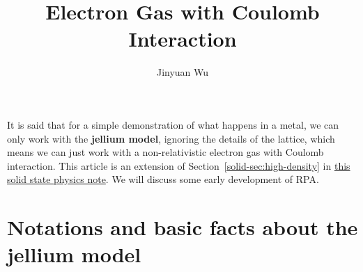 \documentclass[hyperref, a4paper]{article}
\title{Electron Gas with Coulomb Interaction}
\author{Jinyuan Wu}
\newcommand*{\concept}[1]{{\textbf{#1}}}
\newcommand{\soliddoc}{\href{../solid/solid.pdf}{this solid state physics note}}
\begin{document}
\maketitle

It is said that for a simple demonstration of what happens in a metal, we can only work with the \concept{jellium model},
ignoring the details of the lattice, which means we can just work with a non-relativistic electron gas with Coulomb
interaction.  This article is an extension of Section~\ref{solid-sec:high-density} in \soliddoc. We will discuss some early development of RPA.

\section{Notations and basic facts about the jellium model} 
\end{document}
